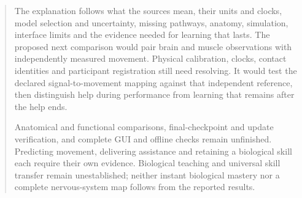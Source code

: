 \documentclass[11pt,a4paper]{article}
\renewcommand{\_}{\char95\relax}
\begin{document}
\begin{abstract}
The explanation follows what the sources mean, their units and clocks, model selection and uncertainty, missing pathways, anatomy, simulation, interface limits and the evidence needed for learning that lasts. The proposed next comparison would pair brain and muscle observations with independently measured movement. Physical calibration, clocks, contact identities and participant registration still need resolving. It would test the declared signal-to-movement mapping against that independent reference, then distinguish help during performance from learning that remains after the help ends.

Anatomical and functional comparisons, final-checkpoint and update verification, and complete GUI and offline checks remain unfinished. Predicting movement, delivering assistance and retaining a biological skill each require their own evidence. Biological teaching and universal skill transfer remain unestablished; neither instant biological mastery nor a complete nervous-system map follows from the reported results.
\end{abstract}
\tableofcontents\clearpage



\clearpage

\par

\begingroup

\endgroup
\clearpage
\appendix

\end{document}
